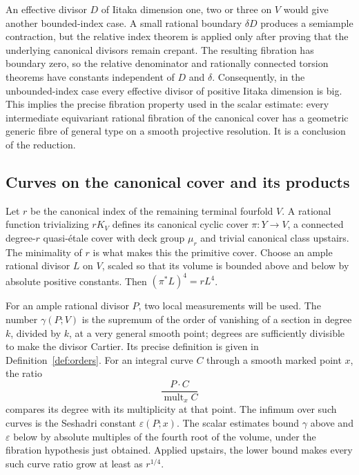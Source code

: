 An effective divisor $D$ of Iitaka dimension one, two or three on
$V$ would give another bounded-index case. A small rational
boundary $\delta D$ produces a semiample contraction, but the
relative index theorem is applied only after proving that the
underlying canonical divisors remain crepant. The resulting
fibration has boundary zero, so the relative denominator and
rationally connected torsion theorems
\cite[Theorem~\RDenominatorNumber{} and Proposition~\RCTorsionNumber]{OpenAIRelative}
have constants independent of $D$ and $\delta$.
Consequently, in the unbounded-index case every effective divisor
of positive Iitaka dimension is big. This implies the precise
fibration property used in the scalar estimate: every intermediate
equivariant rational fibration of the canonical cover has a
geometric generic fibre of general type on a smooth projective
resolution. It is a conclusion of the reduction.

\subsection{Curves on the canonical cover and its products}

Let $r$ be the canonical index of the remaining terminal fourfold
$V$. A rational function trivializing $rK_V$ defines its canonical
cyclic cover $\pi:Y\to V$, a connected degree-$r$ quasi-\'etale cover
with deck group $\mu_r$ and trivial canonical class upstairs. The
minimality of $r$ is what makes this the primitive cover. Choose an
ample rational divisor $L$ on $V$, scaled so that its volume is
bounded above and below by absolute positive constants. Then
$(\pi^*L)^4=rL^4$.

For an ample rational divisor $P$, two local measurements will be
used. The number $\gamma(P;V)$ is the supremum of the order of
vanishing of a section in degree $k$, divided by $k$, at a very
general smooth point; degrees are sufficiently divisible to make
the divisor Cartier. Its precise definition is given in
Definition~\ref{def:orders}. For an integral curve $C$ through a
smooth marked point $x$, the ratio
\[
 \frac{P\cdot C}{\operatorname{mult}_x C}
\]
compares its degree with its multiplicity at that point. The infimum
over such curves is the Seshadri constant $\varepsilon(P;x)$.
The scalar estimates bound $\gamma$ above and $\varepsilon$ below
by absolute multiples of the fourth root of the volume, under the
fibration hypothesis just obtained. Applied upstairs, the lower
bound makes every such curve ratio grow at least as $r^{1/4}$.

